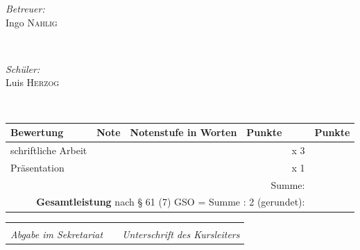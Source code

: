 \begin{center}
\begin{minipage}{0.4\textwidth}
	\begin{flushleft} \large
		\emph{Betreuer:}\\
		Ingo \textsc{Nahlig} %
	\end{flushleft}
\end{minipage}
~
\begin{minipage}{0.4\textwidth}
	\begin{flushright} \large
		\emph{Schüler:} \\
		Luis \textsc{Herzog}%
	\end{flushright}
\end{minipage}\\[1.5cm]

\normalsize

	
\begin{tabularx}{\textwidth}{l|c|p{6.3cm}|c|c|c}
	\textbf{Bewertung} & \textbf{Note} & \textbf{Notenstufe} in Worten & \textbf{Punkte} & & \textbf{Punkte}\\ \midrule
	schriftliche Arbeit & & & & x 3 & \cellcolor{hellhellgrau} \\ \midrule
	Präsentation & & & & x 1 & \cellcolor{hellhellgrau} \\ \midrule
	\multicolumn{5}{r|}{Summe:} & \cellcolor{hellhellgrau} \\ \midrule \midrule
	\multicolumn{5}{r|}{\textbf{Gesamtleistung} \small{nach § 61 (7) GSO = Summe : 2 (gerundet)}:} & \cellcolor{grau} \\ \bottomrule
\end{tabularx}

\vspace{\fill}

\begin{tabular}{cp{2em}c} 
	\hspace{5cm}   && \hspace{5cm} \\\cline{1-1}\cline{3-3} 
	\textit{Abgabe im Sekretariat }    && \textit{Unterschrift des Kursleiters} 
\end{tabular}
\end{center}